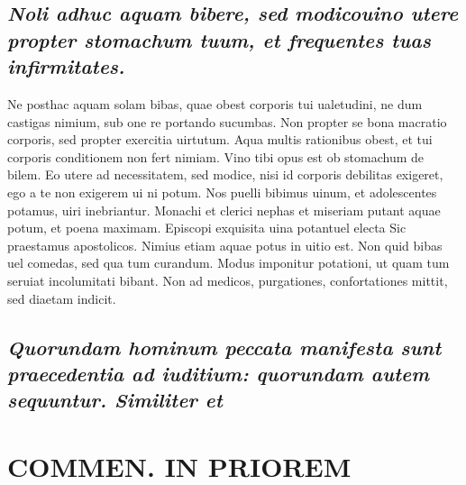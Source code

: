 \documentclass{article}
\begin{document}
\begin{pages}
\subsection*{\textit{Noli adhuc aquam bibere, sed modicouino utere propter stomachum tuum, et frequentes tuas infirmitates. }}\pstart Ne posthac aquam solam bibas, quae obest corporis tui ualetudini, ne dum castigas nimium, sub one re portando sucumbas. Non propter se bona macratio corporis, sed propter exercitia uirtutum. Aqua multis rationibus obest, et tui corporis conditionem non fert nimiam. Vino tibi opus est ob stomachum de bilem. Eo utere ad necessitatem, sed modice, nisi id corporis debilitas exigeret, ego a te non exigerem ui ni potum. Nos puelli bibimus uinum, et adolescentes potamus, uiri inebriantur. Monachi et clerici nephas et miseriam putant aquae potum, et poena maximam. Episcopi exquisita uina potantuel electa Sic praestamus apostolicos. Nimius etiam aquae potus in uitio est. Non quid bibas uel comedas, sed qua tum curandum. Modus imponitur potationi, ut quam tum seruiat incolumitati bibant. Non ad medicos, purgationes, confortationes mittit, sed diaetam indicit.  \pend
{}
{}
\subsection*{\textit{Quorundam hominum peccata manifesta sunt praecedentia ad iuditium: quorundam autem sequuntur. Similiter et }}
\section*{COMMEN. IN PRIOREM }
\marginpar{[ p.150 ]}
{}

\end{pages}
\end{document}
